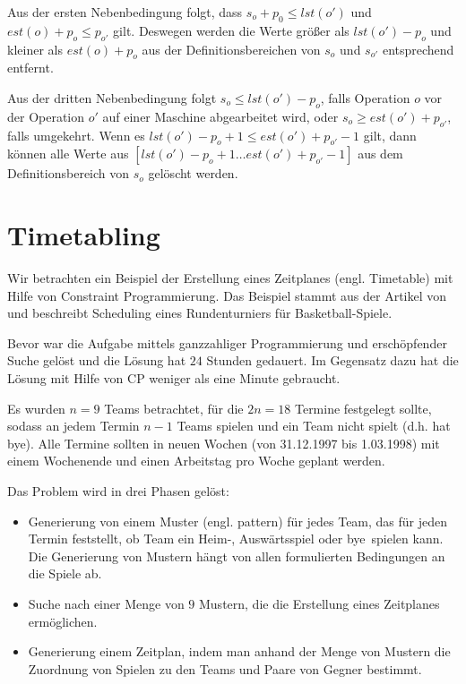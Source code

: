 Aus der ersten Nebenbedingung folgt, dass $s_o+p_0\le lst(o')$ und $est(o)+p_o\le p_{o'}$ gilt. Deswegen werden die Werte größer als $lst(o')-p_o$ und kleiner als  $est(o)+p_o$ aus der Definitionsbereichen von $s_o$ und $s_{o'}$ entsprechend  entfernt.

Aus der dritten Nebenbedingung folgt $s_o\le lst(o') - p_o$, falls Operation $o$ vor der Operation $o'$ auf einer Maschine abgearbeitet wird, oder $s_o \ge est(o') + p_{o'}$, falls umgekehrt. Wenn es $lst(o') - p_o + 1 \le est(o') + p_{o'} -1$ gilt, dann können alle Werte aus $[lst(o') - p_o + 1 \dots est(o') + p_{o'} -1]$ aus dem Definitionsbereich von $s_o$ gelöscht werden.



\section{Timetabling}

Wir betrachten ein Beispiel der Erstellung eines Zeitplanes (engl. Timetable) mit Hilfe von Constraint Programmierung. Das Beispiel stammt aus der Artikel von \cite{Timetabling} und beschreibt Scheduling eines Rundenturniers für Basketball-Spiele.

Bevor \cite{Timetabling} war die Aufgabe mittels ganzzahliger Programmierung und erschöpfender Suche \citep[siehe][]{Timetabling_Trick} gelöst und die Lösung hat $24$ Stunden gedauert. Im Gegensatz dazu hat die Lösung mit Hilfe von CP weniger als eine Minute gebraucht.

Es wurden $n=9$ Teams betrachtet, für die $2n=18$ Termine festgelegt sollte, sodass an jedem Termin $n-1$ Teams spielen und ein Team nicht spielt (d.h. hat \glqq bye\grqq). Alle Termine sollten in neuen Wochen (von 31.12.1997 bis 1.03.1998) mit einem Wochenende und einen Arbeitstag pro Woche geplant werden.

Das Problem wird in drei Phasen gelöst: \begin{itemize}
\setlength{\itemsep}{0pt}
\item Generierung von einem Muster (engl. pattern) für jedes Team, das für jeden Termin feststellt, ob Team ein Heim-, Auswärtsspiel oder \glqq bye\grqq\ spielen kann. Die Generierung von Mustern hängt von allen formulierten Bedingungen an die Spiele ab. 
\item Suche nach einer Menge von $9$ Mustern, die die Erstellung eines Zeitplanes ermöglichen.
\item Generierung einem Zeitplan, indem man anhand der Menge von Mustern die Zuordnung von Spielen zu den Teams und Paare von Gegner bestimmt.
\end{itemize}

